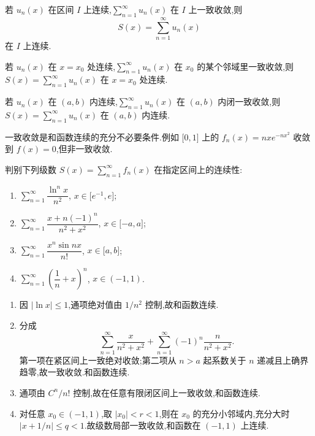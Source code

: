 \begin{theorem}[\markstar]
    若 $u_n(x)$ 在区间 $I$ 上连续,$\displaystyle\sum\limits_{n=1}^{\infty}u_n(x)$ 在 $I$ 上一致收敛,则
    \[
        S(x)=\sum\limits_{n=1}^{\infty}u_n(x)
    \]
    在 $I$ 上连续.
\end{theorem}

\begin{theorem}[\markstar]
    若 $u_n(x)$ 在 $x=x_0$ 处连续,$\displaystyle\sum\limits_{n=1}^{\infty}u_n(x)$ 在 $x_0$ 的某个邻域里一致收敛,则 $S(x)=\displaystyle\sum\limits_{n=1}^{\infty}u_n(x)$ 在 $x=x_0$ 处连续.
\end{theorem}

\begin{theorem}[\markstar]
    若 $u_n(x)$ 在 $(a,b)$ 内连续,$\displaystyle\sum\limits_{n=1}^{\infty}u_n(x)$ 在 $(a,b)$ 内闭一致收敛,则 $S(x)=\displaystyle\sum\limits_{n=1}^{\infty}u_n(x)$ 在 $(a,b)$ 内连续.
\end{theorem}

\begin{remark}
    一致收敛是和函数连续的充分不必要条件.例如 $\lbrack 0,1\rbrack$ 上的 $f_n(x)=nxe^{-nx^2}$ 收敛到 $f(x)=0$,但非一致收敛.
\end{remark}

\begin{example}
    判别下列级数 $\displaystyle S(x)=\sum\limits_{n=1}^{\infty}f_n(x)$ 在指定区间上的连续性:
    \begin{enumerate}
        \item $\displaystyle\sum\limits_{n=1}^{\infty}\dfrac{\ln^n x}{n^2}$, $x\in\lbrack e^{-1},e\rbrack$;
        \item $\displaystyle\sum\limits_{n=1}^{\infty}\dfrac{x+n(-1)^n}{n^2+x^2}$, $x\in\lbrack -a,a\rbrack$;
        \item $\displaystyle\sum\limits_{n=1}^{\infty}\dfrac{x^n\sin nx}{n!}$, $x\in\lbrack a,b\rbrack$;
        \item $\displaystyle\sum\limits_{n=1}^{\infty}\left(\dfrac{1}{n}+x\right)^n$, $x\in(-1,1)$.
    \end{enumerate}
\end{example}
\exampleblank

\begin{solution}
    \leavevmode
    \begin{enumerate}
        \item 因 $|\ln x|\leq1$,通项绝对值由 $1/n^2$ 控制,故和函数连续.
        \item 分成
              \[
                  \displaystyle\sum\limits_{n=1}^{\infty}\dfrac{x}{n^2+x^2}
                  +\sum\limits_{n=1}^{\infty}(-1)^n\dfrac{n}{n^2+x^2}.
              \]
              第一项在紧区间上一致绝对收敛;第二项从 $n>a$ 起系数关于 $n$ 递减且上确界趋零,故一致收敛.和函数连续.
        \item 通项由 $C^n/n!$ 控制,故在任意有限闭区间上一致收敛,和函数连续.
        \item 对任意 $x_0\in(-1,1)$,取 $|x_0|<r<1$,则在 $x_0$ 的充分小邻域内,充分大时 $|x+1/n|\leq q<1$.故级数局部一致收敛,和函数在 $(-1,1)$ 上连续.
    \end{enumerate}
\end{solution}

